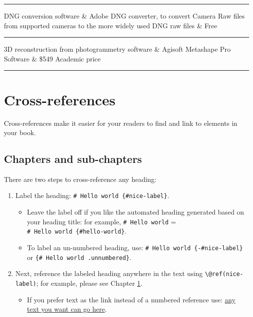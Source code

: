 \documentclass[
]{book}
\providecommand{\tightlist}{%
  \setlength{\itemsep}{0pt}\setlength{\parskip}{0pt}}
\theoremstyle{definition}
\theoremstyle{definition}
\theoremstyle{definition}
\theoremstyle{definition}
\theoremstyle{remark}
\begin{document}
\begin{center}\rule{0.5\linewidth}{0.5pt}\end{center}

DNG conversion software \& Adobe DNG converter, to convert Camera Raw
files from supported cameras to the more widely used DNG raw files \&
Free\\

\begin{center}\rule{0.5\linewidth}{0.5pt}\end{center}

\hfill\break
3D reconstruction from photogrammetry software \& Agisoft Metashape Pro
Software \& \$549 Academic price\\

\begin{center}\rule{0.5\linewidth}{0.5pt}\end{center}

\hypertarget{cross}{%
\chapter{Cross-references}\label{cross}}

Cross-references make it easier for your readers to find and link to elements in your book.

\hypertarget{chapters-and-sub-chapters}{%
\section{Chapters and sub-chapters}\label{chapters-and-sub-chapters}}

There are two steps to cross-reference any heading:

\begin{enumerate}
\def\labelenumi{\arabic{enumi}.}
\tightlist
\item
  Label the heading: \texttt{\#\ Hello\ world\ \{\#nice-label\}}.

  \begin{itemize}
  \tightlist
  \item
    Leave the label off if you like the automated heading generated based on your heading title: for example, \texttt{\#\ Hello\ world} = \texttt{\#\ Hello\ world\ \{\#hello-world\}}.
  \item
    To label an un-numbered heading, use: \texttt{\#\ Hello\ world\ \{-\#nice-label\}} or \texttt{\{\#\ Hello\ world\ .unnumbered\}}.
  \end{itemize}
\item
  Next, reference the labeled heading anywhere in the text using \texttt{\textbackslash{}@ref(nice-label)}; for example, please see Chapter \ref{cross}.

  \begin{itemize}
  \tightlist
  \item
    If you prefer text as the link instead of a numbered reference use: \protect\hyperlink{cross}{any text you want can go here}.
  \end{itemize}
\end{enumerate}
\end{document}
